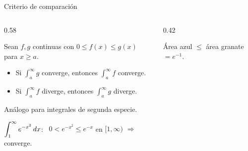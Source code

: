 \documentclass[10pt,aspectratio=169]{beamer}
\begin{document}
\begin{frame}{Criterio de comparación}
  \begin{columns}
    \begin{column}{0.58\textwidth}
      \begin{teorema}[comparación]
        Sean $f,g$ continuas con $0\le f(x)\le g(x)$ para $x\ge a$.
        \begin{itemize}
          \item Si $\int_a^\infty g$ converge, entonces $\int_a^\infty f$ converge.
          \item Si $\int_a^\infty f$ diverge, entonces $\int_a^\infty g$ diverge.
        \end{itemize}
        Análogo para integrales de segunda especie.
      \end{teorema}
      \begin{ejemplo}[1]
        $\displaystyle\int_1^\infty e^{-x^2}\,dx$: \ $0<e^{-x^2}\le e^{-x}$ en $[1,\infty)$ $\Rightarrow$ converge.
      \end{ejemplo}
    \end{column}
    \begin{column}{0.42\textwidth}
      \centering

      \small Área azul $\le$ área granate $=e^{-1}$.
    \end{column}
  \end{columns}
\end{frame}
\end{document}
